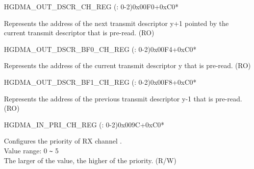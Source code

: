 \begin{register}{H}{GDMA\_OUT\_DSCR\_CH\_REG (: 0-2)}{0x00F0+0xC0*}\label{regdesc:GDMAOUTDSCRCHNREG}
%
\regnewline%
\begin{regdesc}\begin{reglist}
\label{fielddesc:GDMAOUTLINKDSCRCHN}\item [GDMA\_OUTLINK\_DSCR\_CH\regindex{n}] Represents the address of the next transmit descriptor y+1 pointed by the current transmit descriptor that is pre-read. (RO)
\end{reglist}\end{regdesc}
\end{register}


\begin{register}{H}{GDMA\_OUT\_DSCR\_BF0\_CH\_REG (: 0-2)}{0x00F4+0xC0*}\label{regdesc:GDMAOUTDSCRBF0CHNREG}
%
\regnewline%
\begin{regdesc}\begin{reglist}
\label{fielddesc:GDMAOUTLINKDSCRBF0CHN}\item [GDMA\_OUTLINK\_DSCR\_BF0\_CH\regindex{n}] Represents the address of the current transmit descriptor y that is pre-read. (RO)
\end{reglist}\end{regdesc}
\end{register}


\begin{register}{H}{GDMA\_OUT\_DSCR\_BF1\_CH\_REG (: 0-2)}{0x00F8+0xC0*}\label{regdesc:GDMAOUTDSCRBF1CHNREG}
%
\regnewline%
\begin{regdesc}\begin{reglist}
\label{fielddesc:GDMAOUTLINKDSCRBF1CHN}\item [GDMA\_OUTLINK\_DSCR\_BF1\_CH\regindex{n}] Represents the address of the previous transmit descriptor y-1 that is pre-read. (RO)
\end{reglist}\end{regdesc}
\end{register}


\begin{register}{H}{GDMA\_IN\_PRI\_CH\_REG (: 0-2)}{0x009C+0xC0*}\label{regdesc:GDMAINPRICHNREG}
%
%
\regnewline%
\begin{regdesc}\begin{reglist}
\label{fielddesc:GDMARXPRICHN}\item [GDMA\_RX\_PRI\_CH\regindex{n}] Configures the priority of RX channel .\\
Value range: 0 \verb+~+ 5\\
The larger of the value, the higher of the priority. (R/W)
\end{reglist}\end{regdesc}
\end{register}


